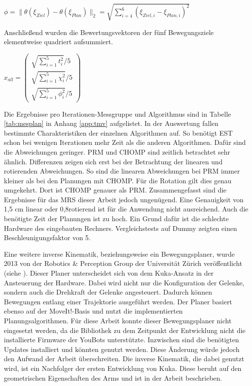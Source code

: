 \begin{math}
	\phi = \|\theta(\xi_{Ziel}) - \theta(\xi_{Plan})\|_2 = \sqrt{\sum_{i=4}^{6}(\xi_{Ziel,i}-\xi_{Plan,i})^2}
\end{math}

Anschließend wurden die Bewertungsvektoren der fünf Bewegungsziele elementweise quadriert aufsummiert.

\begin{math}
	x_{all} = \left(\begin{array}{c}
				\sqrt{\sum_{i=1}^{5} t_i^2}/5\\ 
				\sqrt{\sum_{i=1}^{5} \chi_i^2}/5 \\
				\sqrt{\sum_{i=1}^{5} \phi_i^2}/5 \end{array}\right)	
\end{math}


Die Ergebnisse pro Iterationen-Messgruppe und Algorithmus sind in Tabelle \ref{tab:mesplan} in Anhang \ref{app:tmv} aufgelistet. In der Auswertung fallen bestimmte Charakteristiken der einzelnen Algorithmen auf. So benötigt EST schon bei wenigen Iterationen mehr Zeit als die anderen Algorithmen. Dafür sind die Abweichungen geringer. PRM und CHOMP sind zeitlich betrachtet sehr ähnlich. Differenzen zeigen sich erst bei der Betrachtung der linearen und rotierenden Abweichungen. So sind die linearen Abweichungen bei PRM immer kleiner als bei den Planungen mit CHOMP. Für die Rotation gilt dies genau umgekehrt. Dort ist CHOMP genauer als PRM. Zusammengefasst sind die Ergebnisse für das MRS dieser Arbeit jedoch ungenügend. Eine Genauigkeit von 1,5 cm linear oder 0,8\textdegree{ }rotierend  ist für die Anwendung nicht ausreichend. Auch die benötigte Zeit der Planungen ist zu hoch. Ein Grund dafür ist die schlechte Hardware des eingebauten Rechners. Vergleichstests auf Dummy zeigten einen Beschleunigungsfaktor von 5.

Eine weitere inverse Kinematik, beziehungsweise ein Bewegungsplaner, wurde 2013 von der Robotics \& Perception Group der Universität Zürich veröffentlicht (siehe \cite{muggler2013torque}). Dieser Planer unterscheidet sich von dem Kuka-Ansatz in der Ansteuerung der Hardware. Dabei wird nicht nur die Konfiguration der Gelenke, sondern auch die  Drehkraft der Gelenke angesteuert. Dadurch können Bewegungen entlang einer Trajektorie ausgeführt werden. Der Planer basiert ebenso auf der MoveIt!-Basis und nutzt die implementierten Planungsalgorithmen. Für diese Arbeit konnte dieser Bewegungsplaner nicht eingesetzt werden, da die Bibliothek zu dem Zeitpunkt der Entwicklung nicht die installierte Firmware der YouBots unterstützte. Inzwischen sind die benötigten Updates installiert und könnten genutzt werden. Diese Änderung würde jedoch den Aufwand der Arbeit überschreiten. Die inverse Kinematik, die dabei genutzt wird, ist ein Nachfolger der ersten Entwicklung von Kuka. Diese beruht auf den geometrischen Eigenschaften des Arms und ist in der Arbeit \cite{6309496} beschrieben.

